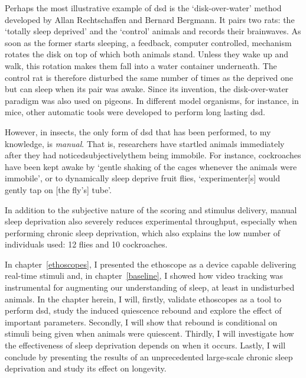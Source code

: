Perhaps the most illustrative example of \gls{dsd} is the `disk-over-water' method
developed by Allan Rechtschaffen and Bernard Bergmann\cite{rechtschaffen_physiological_1983,rechtschaffen_sleep_1995,rechtschaffen_sleep_2002}.
It pairs two rats: the `totally sleep deprived' and the `control'  animals and records their brainwaves. 
As soon as the former starts sleeping, a feedback, computer controlled, mechanism rotates the disk on top of which both animals stand.
Unless they wake up and walk, this rotation makes them fall into a water container underneath.
The control rat is therefore disturbed the same number of times as the deprived one but can sleep when its pair was awake.
Since its invention, the disk-over-water paradigm was also used on pigeons\cite{newman_sleep_2008}.
In different model organisms, for instance, in mice, other automatic tools were developed to perform long lasting \gls{dsd}\cite{fenzl_fully_2007}.

However, in insects, the only form of \gls{dsd} that has been performed, to my knowledge, is \emph{manual}.
That is, researchers have startled animals immediately after they had noticed\emd{}subjectively\emd{}them being immobile.
For instance, cockroaches have been kept awake by `gentle shaking of the cages whenever the animals were immobile'\cite{tobler_24-h_1992}, or to dynamically sleep deprive fruit flies, `experimenter[s] would gently tap on [the fly's] tube'\cite{shaw_stress_2002}.

In addition to the subjective nature of the scoring and stimulus delivery, manual sleep deprivation also severely reduces experimental throughput, especially when performing chronic sleep deprivation, which also explains the low number of individuals used: 12 flies \cite{shaw_stress_2002} and 10 cockroaches\cite{tobler_24-h_1992}.

In chapter~\ref{ethoscopes}, I presented the ethoscope as a device capable delivering real-time stimuli and, in chapter~\ref{baseline}, 
I showed how video tracking was instrumental for augmenting our understanding of sleep, at least in undisturbed animals.
In the chapter herein, I will, firstly, validate ethoscopes as a tool to perform \gls{dsd}, study the induced quiescence rebound and explore the effect of important parameters.
Secondly, I will show that rebound is conditional on stimuli being given when animals were quiescent.
Thirdly, I will investigate how the effectiveness of sleep deprivation depends on when it occurs.
Lastly, I will conclude by presenting the results of an unprecedented large-scale chronic sleep deprivation and study its effect on longevity.

